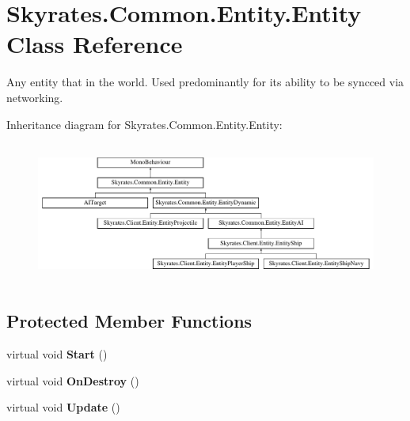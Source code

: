 \hypertarget{class_skyrates_1_1_common_1_1_entity_1_1_entity}{\section{Skyrates.\-Common.\-Entity.\-Entity Class Reference}
\label{class_skyrates_1_1_common_1_1_entity_1_1_entity}
}


Any entity that in the world. Used predominantly for its ability to be syncced via networking.  


Inheritance diagram for Skyrates.\-Common.\-Entity.\-Entity\-:\begin{figure}[H]
\begin{center}
\leavevmode
\includegraphics[height=4.666667cm]{class_skyrates_1_1_common_1_1_entity_1_1_entity}
\end{center}
\end{figure}
\subsection*{Protected Member Functions}
\begin{DoxyCompactItemize}
\item 
\hypertarget{class_skyrates_1_1_common_1_1_entity_1_1_entity_acb5cc7450eefd4c794e9f72e0a422834}{virtual void {\bfseries Start} ()}\label{class_skyrates_1_1_common_1_1_entity_1_1_entity_acb5cc7450eefd4c794e9f72e0a422834}

\item 
\hypertarget{class_skyrates_1_1_common_1_1_entity_1_1_entity_a9a9f1e893f8e853e3177d70eb67a82f6}{virtual void {\bfseries On\-Destroy} ()}\label{class_skyrates_1_1_common_1_1_entity_1_1_entity_a9a9f1e893f8e853e3177d70eb67a82f6}

\item 
\hypertarget{class_skyrates_1_1_common_1_1_entity_1_1_entity_a888a855cc2fd1a8133a18c085eca65e9}{virtual void {\bfseries Update} ()}\label{class_skyrates_1_1_common_1_1_entity_1_1_entity_a888a855cc2fd1a8133a18c085eca65e9}

\end{DoxyCompactItemize}


